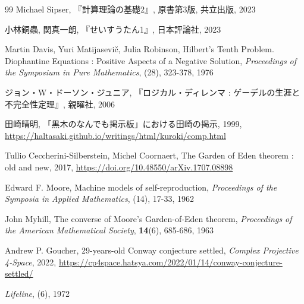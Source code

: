 \documentclass[10pt, a5paper, twoside]{ltjsarticle}
\begin{document}
\begin{thebibliography}{99}
         Michael Sipser, 『計算理論の基礎2』, 原書第3版, 共立出版, 2023

         小林銅蟲, 関真一朗, 『せいすうたん1』, 日本評論社, 2023

         Martin Davis, Yuri Matijasevič, Julia Robinson, Hilbert's Tenth Problem. Diophantine Equations : Positive Aspects of a Negative Solution, \textit{Proceedings of the Symposium in Pure Mathematics}, (28), 323-378, 1976

         ジョン・W・ドーソン・ジュニア, 『ロジカル・ディレンマ : ゲーデルの生涯と不完全性定理』, 親曜社, 2006

         田崎晴明, 「黒木のなんでも掲示板」における田崎の掲示, 1999, \url{https://haltasaki.github.io/writings/html/kuroki/comp.html}

         Tullio Ceccherini-Silberstein, Michel Coornaert, The Garden of Eden theorem : old and new, 2017, \url{https://doi.org/10.48550/arXiv.1707.08898}

         Edward F. Moore, Machine models of self-reproduction, \textit{Proceedings of the Symposia in Applied Mathematics}, (14), 17-33, 1962

         John Myhill, The converse of Moore's Garden-of-Eden theorem, \textit{Proceedings of the American Mathematical Society}, \textbf{14}(6), 685-686, 1963

         Andrew P. Goucher, 29-years-old Conway conjecture settled, \textit{Complex Projective 4-Space}, 2022, \url{https://cp4space.hatsya.com/2022/01/14/conway-conjecture-settled/}

         \textit{Lifeline}, (6), 1972

    \end{thebibliography}
\end{document}
